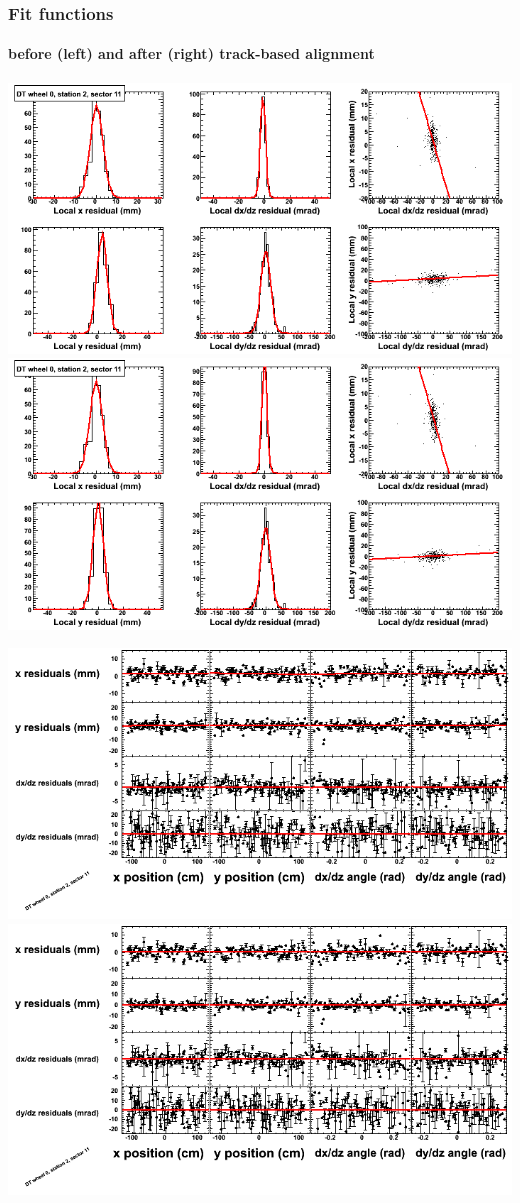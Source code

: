 \documentclass[compress]{beamer}
\begin{document}
\begin{frame}
\frametitle{Fit functions}
\framesubtitle{before (left) and after (right) track-based alignment}
\includegraphics[width=0.5\linewidth]{fitfunctions_re01/MBwhCst2sec11_bellcurves.png} \includegraphics[width=0.5\linewidth]{fitfunctions_re05/MBwhCst2sec11_bellcurves.png}

\includegraphics[width=0.5\linewidth]{fitfunctions_re01/MBwhCst2sec11_polynomials.png} \includegraphics[width=0.5\linewidth]{fitfunctions_re05/MBwhCst2sec11_polynomials.png}
\end{frame}
\end{document}
